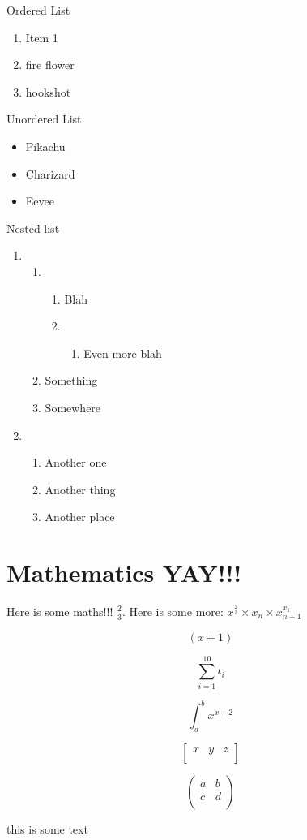 \documentclass{article}[18pt]
\begin{document}
Ordered List
\begin{enumerate}
\item Item 1
\item fire flower
\item hookshot
\end{enumerate}
Unordered List
\begin{itemize}
\item Pikachu
\item Charizard
\item Eevee
\end{itemize}
Nested list
\begin{enumerate}
    \item 
        \begin{enumerate}
        \item 
            \begin{enumerate}
                \item Blah
                \item 
                    \begin{enumerate}
                    \item Even more blah
                    
                    \end{enumerate}
            \end{enumerate}
        \item Something
        \item Somewhere
        \end{enumerate}
    \item 
        \begin{enumerate}
        \item Another one
        \item Another thing
        \item Another place
        \end{enumerate}
\end{enumerate}



\section{Mathematics YAY!!!}

Here is some maths!!! $ \frac{2}{3} $. Here is some more:
$
x^{\frac{2}{3}} \times x_{n} \times x_{n + 1}^{x_{1}}
$

$$
\left(x + 1\right)
$$

$$
\sum_{i=1}^{10} t_i
$$

$$
\int_{a}^{b} x^{x + 2}
$$

$$
\begin{bmatrix}
x & y & z \\
\end{bmatrix}
$$

$$
\begin{pmatrix}
a & b \\
c & d \\
\end{pmatrix}
$$


this is some text \cite{Kalicharan}



\end{document}
